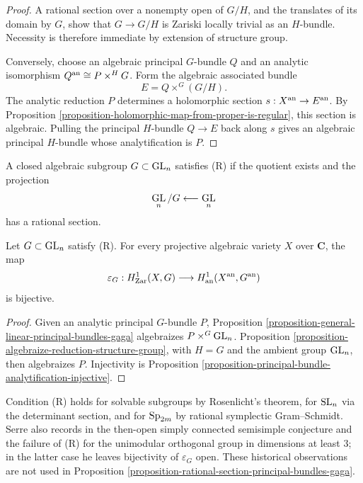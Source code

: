 \begin{proof}
A rational section over a nonempty open of $G/H$, and the translates of
its domain by $G$, show that $G\to G/H$ is Zariski locally trivial as an
$H$-bundle.
Necessity is therefore immediate by extension of structure group.

Conversely, choose an algebraic principal $G$-bundle $Q$ and an analytic
isomorphism $Q^{\rm an}\cong P\times^H G$. Form the algebraic associated
bundle
$$
E=Q\times^G(G/H).
$$
The analytic reduction $P$ determines a holomorphic section
$s:X^{\rm an}\to E^{\rm an}$. By Proposition
\ref{proposition-holomorphic-map-from-proper-is-regular}, this section is
algebraic. Pulling the principal $H$-bundle $Q\to E$ back along $s$ gives an
algebraic principal $H$-bundle whose analytification is $P$.
\end{proof}

\begin{definition}
\label{definition-rational-section-condition}
\begin{reference}
\cite[\S 4, no. 20, condition (R)]{GAGA}
\end{reference}
A closed algebraic subgroup $G\subset\mathop{\rm GL}_n$ satisfies
\textup{(R)} if the quotient exists and the projection
$$
\mathop{\rm GL}_n/G\longleftarrow\mathop{\rm GL}_n
$$
has a rational section.
\end{definition}

\begin{proposition}
\label{proposition-rational-section-principal-bundles-gaga}
\begin{reference}
\cite[\S 4, no. 20, Proposition 20]{GAGA}
\end{reference}
Let $G\subset\mathop{\rm GL}_n$ satisfy \textup{(R)}. For every projective
algebraic variety $X$ over $\mathbf C$, the map
$$
\varepsilon_G:H^1_{\rm Zar}(X,G)
\longrightarrow H^1_{\rm an}(X^{\rm an},G^{\rm an})
$$
is bijective.
\end{proposition}

\begin{proof}
Given an analytic principal $G$-bundle $P$, Proposition
\ref{proposition-general-linear-principal-bundles-gaga} algebraizes
$P\times^G\mathop{\rm GL}_n$. Proposition
\ref{proposition-algebraize-reduction-structure-group}, with
$H=G$ and the ambient group $\mathop{\rm GL}_n$, then algebraizes $P$.
Injectivity is Proposition
\ref{proposition-principal-bundle-analytification-injective}.
\end{proof}

\begin{remark}
\label{remark-rational-section-condition-examples}
Condition \textup{(R)} holds for solvable subgroups by Rosenlicht's theorem,
for $\mathop{\rm SL}_n$ via the determinant section, and for
$\mathop{\rm Sp}_{2m}$ by rational symplectic Gram--Schmidt. Serre also
records in \cite[\S 4, no. 20]{GAGA} the then-open simply connected
semisimple conjecture and the failure of \textup{(R)} for the unimodular
orthogonal group in dimensions at least $3$; in the latter case he leaves
bijectivity of $\varepsilon_G$ open. These historical observations are not
used in Proposition
\ref{proposition-rational-section-principal-bundles-gaga}.
\end{remark}
